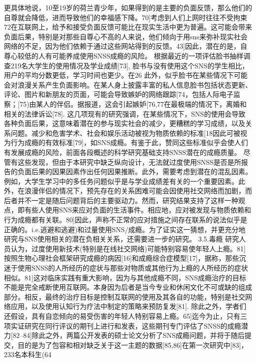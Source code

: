更具体地说，10至19岁的荷兰青少年，如果得到的是主要的负面反馈，那么他们的自尊就会降低，进而导致他们的幸福感下降。70]考虑到人们上网时往往不受拘束72在互联网上，给予和接受负面反馈可能比在现实生活中更为普遍。这可能会带来负面后果，特别是对那些自尊心不高的人来说，他们倾向于用sns来弥补现实社会网络的不足，因为他们依赖于通过这些网站得到的反馈。43]因此，潜在的是，自尊心较低的人有可能养成使用SNSS成瘾的风险。
根据最近的一项评估脸书抽样调查219名大学生的使用情况及学业成绩[73], 脸书与没有使用这个SNS的学生相比，用户的平均分数更低，学习时间也更少。在26%
此外，似乎脸书在某些情况下可能会对浪漫关系产生负面影响。在某人身上披露丰富的私人信息脸书包括状态更新、评论、图片和新朋友的页面，可能会导致嫉妒的网络跟踪[74，包括人际电子监察；[75)由某人的伴侣。据报道，这会引起嫉妒[76,77在最极端的情况下，离婚和相关的法律诉讼[78].
这几项现有的研究强调，在某些情况下，SNS的使用会导致各种负面后果，这意味着潜在的参与现实社会的减少，更糟糕的学习成绩，以及关系问题。减少和危害学术、社会和娱乐活动被视为物质依赖的标准[18因此可被视为行为成瘾的有效标准[79]，如SNS成瘾。有鉴于此，赞同这些标准似乎会使人们有发展成瘾的风险，前面各段概述的科学研究基础支持SNSS潜在的成瘾质量。
尽管有这些发现，但由于本研究中缺乏纵向设计，无法就过度使用SNSS是否是所报告的负面后果的因果因素作出任何因果推断。此外，需要考虑到潜在的混乱因素。例如，大学生学习中的多任务问题似乎是与学业成绩差有关的一个重要因素。此外，在浪漫伴侣的情况下，预先存在的关系困难可能会因使用社交网络而加剧，而后者并不一定是随后问题背后的主要驱动力。然而，研究结果支持了这样一种观点，即有些人使用SNS来应对负面的生活事件。相应地，应对被发现与物质依赖和行为成瘾都有关联。80]因此，声称不正常的应对措施之间存在联系的说法似乎是正确的。i.e.逃避和逃避)和过量使用SNS/成瘾。为了证实这一猜想，并更充分地研究与SNS使用相关的潜在负相关关系，还需要进一步的研究。
3.5.毒瘾
研究人员认为，过度使用新技术(特别是在线社交网络)可能特别容易使年轻人上瘾。81]按照生物心理社会框架研究成瘾的病因[16]和成瘾综合症模型[17]，据称，那些沉迷于使用SNSS的人所经历的症状与那些对物质或其他行为上瘾的人所经历的症状相似。81]这对临床实践有重大影响，因为与其他成瘾不同，SNS成瘾治疗的目标不能是完全戒断使用互联网。本身因为后者是当今专业和休闲文化不可或缺的组成部分。相反，最终的治疗目标是控制互联网的使用及其各自的功能，特别是社交网络应用，以及使用认知行为疗法中制定的策略来预防复发[81].
除此之外，学者们还假设，具有自恋倾向的易受伤害的年轻人特别容易上瘾。65]迄今为止，只有三项实证研究在同行评议的期刊上进行和发表，这些期刊专门评估了SNSS的成瘾潜力[82–84]除此之外，两篇公开发表的硕士论文分析了SNS成瘾问题，并将于随后提交，目的是为了包容和相对缺乏关于这一主题的数据[85,86]在第一次研究中[83]，233名本科生(64%
